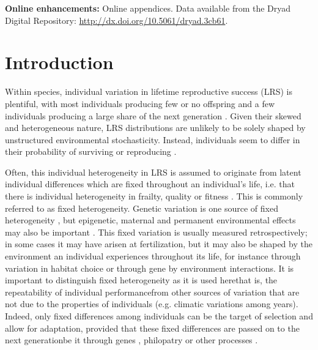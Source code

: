 \textbf{Online enhancements: }
Online appendices. Data available from the Dryad Digital Repository: \url{http://dx.doi.org/10.5061/dryad.3cb61}.

\section[Introduction]{Introduction}

Within species, individual variation in lifetime reproductive success (LRS) is plentiful, with most individuals producing few or no offspring and a few individuals producing a large share of the next generation \parencite{Clutton1988,Stearns1992}. Given their skewed and heterogeneous nature, LRS distributions are unlikely to be solely shaped by unstructured environmental stochasticity. Instead, individuals seem to differ in their probability of surviving or reproducing \parencite{Kendall2011}.

Often, this individual heterogeneity in LRS is assumed to originate from latent individual differences which are fixed throughout an individual's life, i.e. that there is individual heterogeneity in frailty, quality or fitness \parencite[e.g.][]{Vaupel1979,Morris1998, Cam2000}. This is commonly referred to as fixed heterogeneity. Genetic variation is one source of fixed heterogeneity \parencite[e.g.][]{Keller2002,Ellegren2008}, but epigenetic, maternal and permanent environmental effects may also be important \parencite{Wolf2009,Turner2009}. This fixed variation is usually measured retrospectively; in some cases it may have arisen at fertilization, but it may also be shaped by the environment an individual experiences throughout its life, for instance through variation in habitat choice or through gene by environment interactions. It is important to distinguish fixed heterogeneity as it is used here\textemdash that is, the repeatability of individual performance\textemdash from other sources of variation that are not due to the properties of individuals (e.g. climatic variations among years). Indeed, only fixed differences among individuals can be the target of selection and allow for adaptation, provided that these fixed differences are passed on to the next generation\textemdash be it through genes \parencite{Keller2002}, philopatry \parencite{Schauber2011} or other processes \parencite{Bonduriansky2012}. 

